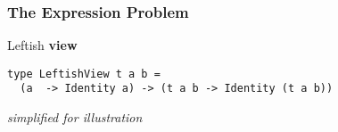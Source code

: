 \begin{frame}[fragile]
\frametitle{The Expression Problem}
\begin{block}{Leftish \textbf{view}}
\begin{lstlisting}[style=haskell,mathescape]
type LeftishView t a b =
  (a  -> Identity a) -> (t a b -> Identity (t a b))
\end{lstlisting}
\end{block}
\tiny{\emph{simplified for illustration}}
\end{frame}
